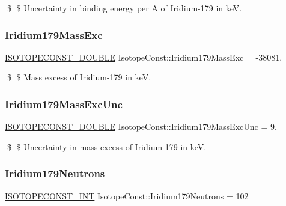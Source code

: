 \$ \$ Uncertainty in binding energy per A of Iridium-\/179 in keV. \mbox{\label{group___isotope_const-_iridium-_ir179_gaa73ee9c8bddc07e36b4ed96d0f4e319f}} 
\subsubsection{\texorpdfstring{Iridium179\+Mass\+Exc}{Iridium179MassExc}}
{\footnotesize\ttfamily \mbox{\hyperlink{group___isotope_const-_macros_ga8f45a7272ce02c0b4c65c44636ed719a}{I\+S\+O\+T\+O\+P\+E\+C\+O\+N\+S\+T\+\_\+\+D\+O\+U\+B\+LE}} Isotope\+Const\+::\+Iridium179\+Mass\+Exc = -\/38081.}

\$ \$ Mass excess of Iridium-\/179 in keV. \mbox{\label{group___isotope_const-_iridium-_ir179_gab7cd7dcb0cb24d94154ad397c42abb9a}} 
\subsubsection{\texorpdfstring{Iridium179\+Mass\+Exc\+Unc}{Iridium179MassExcUnc}}
{\footnotesize\ttfamily \mbox{\hyperlink{group___isotope_const-_macros_ga8f45a7272ce02c0b4c65c44636ed719a}{I\+S\+O\+T\+O\+P\+E\+C\+O\+N\+S\+T\+\_\+\+D\+O\+U\+B\+LE}} Isotope\+Const\+::\+Iridium179\+Mass\+Exc\+Unc = 9.}

\$ \$ Uncertainty in mass excess of Iridium-\/179 in keV. \mbox{\label{group___isotope_const-_iridium-_ir179_gac33a1439721484784b8b009db71fd211}} 
\subsubsection{\texorpdfstring{Iridium179\+Neutrons}{Iridium179Neutrons}}
{\footnotesize\ttfamily \mbox{\hyperlink{group___isotope_const-_macros_ga5f18360b3e99483a35c32d789e62621c}{I\+S\+O\+T\+O\+P\+E\+C\+O\+N\+S\+T\+\_\+\+I\+NT}} Isotope\+Const\+::\+Iridium179\+Neutrons = 102}

